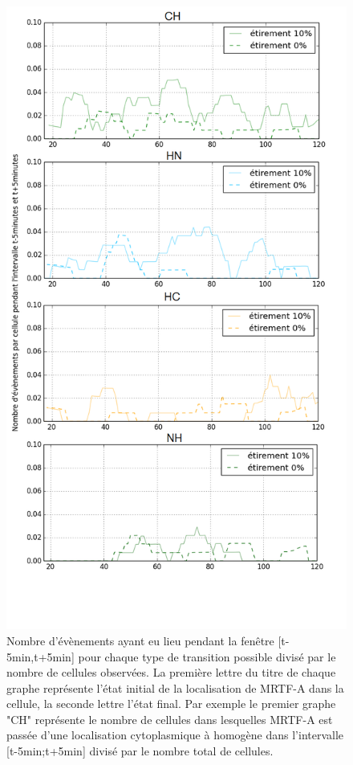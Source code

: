 \documentclass                                                                                                                                                                                                                                                                                                                                       {report}
\begin{document}
\begin{figure}[p]
\includegraphics[scale=0.33]{Figures/Etirement10_vs_0_translocations.png} 
\caption{\label{transloc_dyn_Et10} Nombre d'évènements ayant eu lieu pendant la fenêtre [t-5min,t+5min] pour chaque type de transition possible divisé par le nombre de cellules observées. La première lettre du titre de chaque graphe représente l'état initial de la localisation de MRTF-A dans la cellule, la seconde lettre l'état final. Par exemple le premier graphe "CH" représente le nombre de cellules dans lesquelles MRTF-A est passée d'une localisation cytoplasmique à homogène dans l'intervalle [t-5min;t+5min] divisé par le nombre total de cellules.}
\end{figure}
\end{document}
